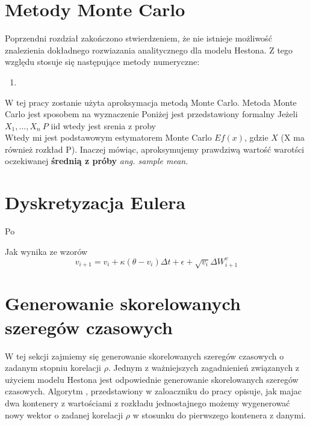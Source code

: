 \documentclass{pracamgr}
\begin{document}

\section{Metody Monte Carlo}

Poprzendni rozdział zakończono stwierdzeniem, że nie istnieje możliwość znalezienia dokładnego rozwiazania analitycznego
dla modelu Hestona. Z tego względu stosuje się następujące metody numeryczne:
\begin{enumerate}
\item 
\end{enumerate}

W tej pracy zostanie użyta aproksymacja metodą Monte Carlo. Metoda Monte Carlo jest sposobem na wyznaczenie 
Poniżej jest przedstawiony formalny 
Jeżeli $X_1, ..., X_n ~P$ iid  wtedy
jest srenia z proby 
\begin{equation}
  
\end{equation}
Wtedy mi jest podstawowym estymatorem Monte Carlo $Ef(x)$, gdzie $X$ (X ma również rozkład P). Inaczej mówiąc, aproksymujemy prawdziwą wartość warotści oczekiwanej \textbf{średnią z próby} \textit{ang. sample mean}.



\section{Dyskretyzacja Eulera}

Po

 Jak wynika ze wzorów  
\begin{equation}\label{h:euler}
v_{i+1}  = v_i + \kappa (\theta - v_i) \Delta t + \epsilon +  \sqrt{v_i} \Delta W^{v}_{i+1}
\end{equation}
  
\section{Generowanie skorelowanych szeregów czasowych}
W tej sekcji zajmiemy się generowanie skorelowanych szeregów czasowych o zadanym stopniu korelacji $\rho$.
Jednym z ważniejszych zagadnienień związanych z użyciem modelu Hestona jest odpowiednie generowanie skorelowanych szeregów czasowych. Algorytm , przedstawiony w zaloaczniku do pracy opisuje, jak majac dwa kontenery z wartościami z rozkładu jednostajnego możemy wygenerować nowy wektor o zadanej korelacji $\rho$ w stosunku do pierwszego kontenera z danymi. 
\end{document}
